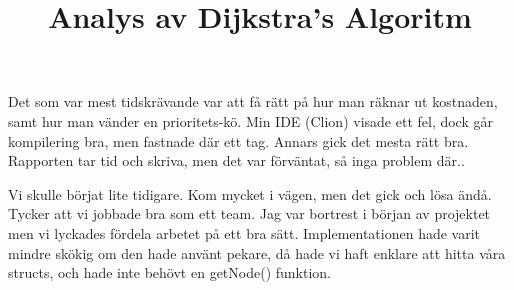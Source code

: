 \documentclass[fleqn,10pt]{article}
\begin{document}
\title{Analys av Dijkstra's Algoritm}

Det som var mest tidskrävande var att få rätt på hur man räknar ut kostnaden, samt hur man vänder en prioritets-kö.
Min IDE (Clion) visade ett fel, dock går kompilering bra, men fastnade där ett tag.
Annars gick det mesta rätt bra.
Rapporten tar tid och skriva, men det var förväntat, så inga problem där..

Vi skulle börjat lite tidigare.
Kom mycket i vägen, men det gick och lösa ändå.
Tycker att vi jobbade bra som ett team.
Jag var bortrest i början av projektet men vi lyckades fördela arbetet på ett bra sätt.
Implementationen hade varit mindre skökig om den hade använt pekare, då hade vi haft enklare att hitta våra structs, och hade inte behövt en getNode() funktion.
\end{document}
